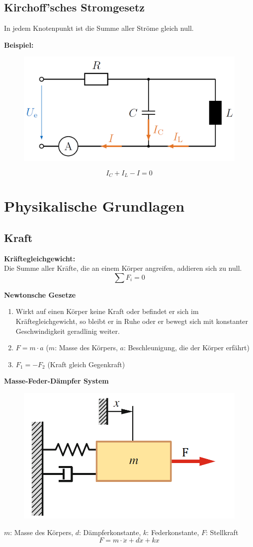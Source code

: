 \documentclass[10pt,a4paper]{article}
\renewcommand{\arraystretch}{1.5}
\newcommand{\tab}[1][1]{\hspace*{#1cm}}
\begin{document}
\subsection{Kirchoff'sches Stromgesetz}
In jedem Knotenpunkt ist die Summe aller Ströme gleich null.

\textbf{Beispiel:}
\begin{figure}[H]
	\includegraphics[width=0.5\columnwidth]{imgs/kcl.png}
\end{figure}
$$
	I_C + I_L - I = 0
$$

\renewcommand{\arraystretch}{1}
\section{Physikalische Grundlagen}
\subsection{Kraft}
\textbf{Kräftegleichgewicht:} \\
Die Summe aller Kräfte, die an einem Körper angreifen, addieren sich zu null.
$$
	\sum F_i = 0
$$

\textbf{Newtonsche Gesetze}
\begin{enumerate}
	\item Wirkt auf einen Körper keine Kraft oder befindet er sich im Kräftegleichgewicht, so bleibt er in Ruhe oder er bewegt sich mit konstanter Geschwindigkeit geradlinig weiter.
	\item $F = m ⋅ a$ \tab[2] ($m$: Masse des Körpers, $a$: Beschleunigung, die der Körper erfährt)
	\item $F_1 = -F_2$ \tab[2] (Kraft gleich Gegenkraft)
\end{enumerate}

\textbf{Masse-Feder-Dämpfer System}
\begin{figure}[H]
	\includegraphics[width=0.5\columnwidth]{imgs/mass-spring-damper.png}
\end{figure}
$m$: Masse des Körpers, $d$: Dämpferkonstante, $k$: Federkonstante, $F$: Stellkraft
$$
	F = m ⋅ \ddot x + d \dot x + k x
$$
\end{document}
